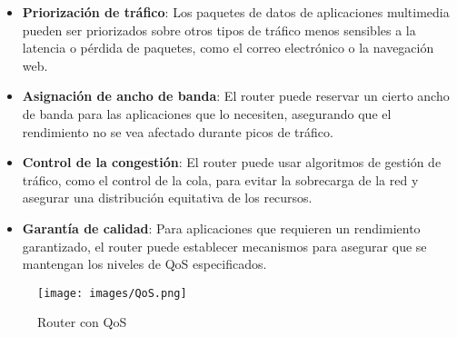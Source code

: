 \documentclass[a4paper,12pt]{article}
\begin{document}
\begin{itemize}
    \item \textbf{Priorización de tráfico}: Los paquetes de datos de aplicaciones multimedia pueden ser priorizados sobre otros tipos de tráfico menos sensibles a la latencia o pérdida de paquetes, como el correo electrónico o la navegación web.
    \item \textbf{Asignación de ancho de banda}: El router puede reservar un cierto ancho de banda para las aplicaciones que lo necesiten, asegurando que el rendimiento no se vea afectado durante picos de tráfico.
    \item \textbf{Control de la congestión}: El router puede usar algoritmos de gestión de tráfico, como el control de la cola, para evitar la sobrecarga de la red y asegurar una distribución equitativa de los recursos.
    \item \textbf{Garantía de calidad}: Para aplicaciones que requieren un rendimiento garantizado, el router puede establecer mecanismos para asegurar que se mantengan los niveles de QoS especificados.
\end{itemize}

\begin{figure}[H]
    \centering
    \texttt{[image: images/QoS.png]}
    \caption{Router con QoS}
    \label{fig:qos}
\end{figure}
\end{document}
